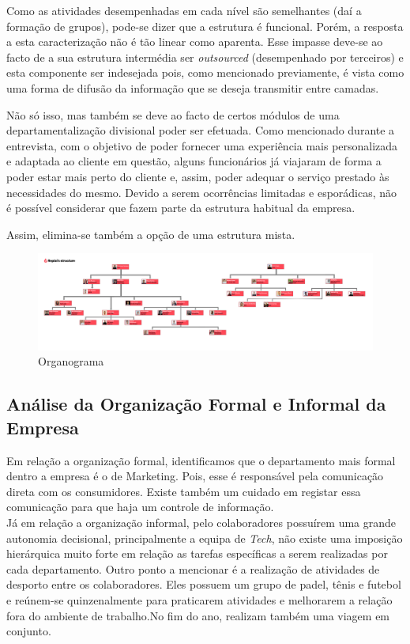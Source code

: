 Como as atividades desempenhadas em cada nível são semelhantes (daí a formação de grupos), pode-se dizer que a estrutura é funcional. Porém, a resposta a esta caracterização não é tão linear como aparenta. Esse impasse deve-se ao facto de a sua estrutura intermédia ser \textit{outsourced} (desempenhado por terceiros) e esta componente ser indesejada pois, como mencionado previamente, é vista como uma forma de difusão da informação que se deseja transmitir entre camadas.
  
Não só isso, mas também se deve ao facto de certos módulos de uma departamentalização divisional poder ser efetuada. Como mencionado durante a entrevista, com o objetivo de poder fornecer uma experiência mais personalizada e adaptada ao cliente em questão, alguns funcionários já viajaram de forma a poder estar mais perto do cliente e, assim, poder adequar o serviço prestado às necessidades do mesmo. Devido a serem ocorrências limitadas e esporádicas, não é possível considerar que fazem parte da estrutura habitual da empresa.
  
Assim, elimina-se também a opção de uma estrutura mista.

\begin{figure}[ht]
    \centering
    \includegraphics[width=15cm]{images/organograma.png}
    \caption{Organograma}
    \label{fig:organograma}
\end{figure}

\subsection{Análise da Organização Formal e Informal da Empresa}

Em relação a organização formal, identificamos que o departamento mais formal dentro a empresa é o de Marketing. Pois, esse é responsável pela comunicação direta com os consumidores. Existe também um cuidado em registar essa comunicação para que haja um controle de informação. \\

Já em relação a organização informal, pelo colaboradores possuírem uma grande autonomia decisional, principalmente a equipa de \textit{Tech}, não existe uma imposição hierárquica muito forte em relação as tarefas específicas a serem realizadas por cada departamento.
Outro ponto a mencionar é a realização de atividades de desporto entre os colaboradores. Eles possuem um grupo de padel, tênis e futebol e reúnem-se quinzenalmente para praticarem atividades e melhorarem a relação fora do ambiente de trabalho.No fim do ano, realizam também uma viagem em conjunto.


